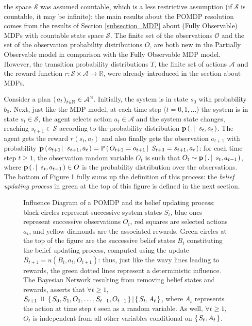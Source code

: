 the space $\mathcal{S}$ was assumed countable,
which is a less restrictive assumption 
(if $\mathcal{S}$ is countable, it may be infinite):
the main results about the POMDP resolution 
comes from the results of Section \ref{subsection_MDP} 
about (Fully Observable) MDPs 
with countable state space $\mathcal{S}$.
The finite set of the observations $\mathcal{O}$ 
and the set of the observation probability distributions $O$,
are both new in the Partially Observable model
in comparison with the Fully Observable MDP model. 
However, the transition probability distributions $T$,
the finite set of actions $\mathcal{A}$ 
and the reward function $r: \mathcal{S} \times \mathcal{A} \rightarrow \mathbb{R}$, 
were already introduced in the section about MDPs.

Consider a plan $\left( \left. a_t \right. \right)_{t \in \mathbb{N}} \in \mathcal{A}^{\mathbb{N}}$. 
Initially, the system is in state $s_0$ with probability $b_{0}$. 
Next, just like the MDP model, 
at each time step ($t=0,1,\ldots$) 
the system is in state $s_t \in \mathcal{S}$, 
the agent selects action $a_t \in \mathcal{A}$ 
and the system state changes,
reaching $s_{t+1} \in \mathcal{S}$ according to 
the probability distribution $\textbf{p} \left( \left.  . \, \right| \left. \, s_t , a_t \right. \right)$. 
The agent gets the reward $r(s_t,a_t)$ 
and also finally gets the observation $o_{t+1}$ 
with probability $\textbf{p} \left( \left.  o_{t+1} \, \right| \left. \, s_{t+1} , a_t  \right. \right) = \mathbb{P} \left( \left.  O_{t+1} = o_{t+1} \, \right| \left. \, S_{t+1} = s_{t+1}, a_t  \right. \right)$:
for each time step $t \geqslant 1$,
the observation random variable $O_t$
is such that $O_{t} \sim \textbf{p} \left( \left.  . \, \right| \left. \, s_{t} , a_{t-1}  \right. \right)$,
where $\textbf{p} \left( \left.  . \, \right| \left. \, s_{t} , a_{t-1}  \right. \right) \in O$ 
is the probability distribution over the observations.
The bottom of Figure \ref{POMDP} fully sums up the 
definition of this process: 
the \textit{belief updating process} 
in green at the top of this figure 
is defined in the next section.

\begin{figure}[!t]

\caption[Influence Diagram of a POMDP and its belief updating process]{
Influence Diagram of a POMDP and its belief updating process:
black circles represent successive system states $S_t$,
blue ones represent successive observations $O_t$,
red squares are selected actions $a_t$,
and yellow diamonds are the associated rewards.
Green circles at the top of the figure are the successive belief states 
$B_t$ constituting the belief updating process,
computed using the update $B_{t+1} = u(B_t,a_t,O_{t+1})$: 
thus, just like the wavy lines leading to rewards, 
the green dotted lines represent a deterministic influence.
The Bayesian Network resulting from removing belief states and rewards, 
asserts that $\forall t \geqslant 1$, $S_{t+1} \perp\!\!\!\perp \left\{ \left.  S_{0},S_1, O_1, \ldots, S_{t-1}, O_{t-1}  \right. \right\} \vert \left\{ \left. S_t,A_t \right. \right\}$,
where $A_t$ represents the action at time step $t$ seen as a random variable.
As well, $\forall t \geqslant 1$, $O_{t}$ is independent from all other variables 
conditional on $\left\{ \left. S_t, A_t \right. \right\}$.}
\label{POMDP} 
\end{figure}

